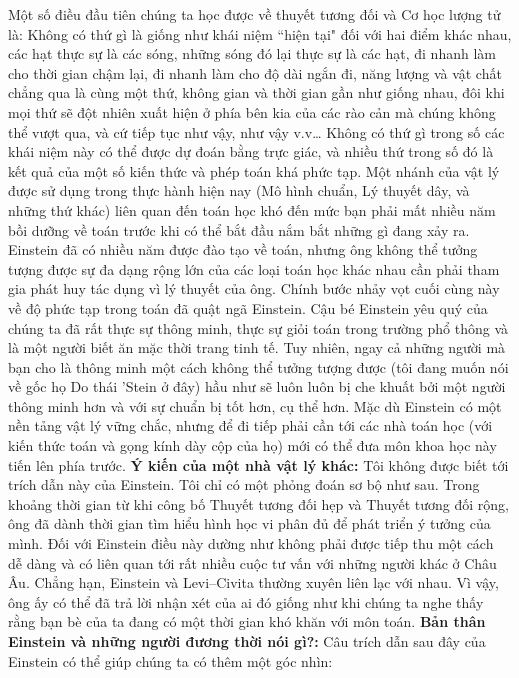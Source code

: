 \begin{multicols}{2}
	\vskip 0.1cm
	Một số điều đầu tiên chúng ta học được về thuyết tương đối và Cơ học lượng tử là: Không có thứ gì là giống như khái niệm ``hiện tại" đối với hai điểm khác nhau, các hạt thực sự là các sóng, những sóng đó lại thực sự là các hạt, đi nhanh làm cho thời gian chậm lại, đi nhanh làm cho độ dài ngắn đi, năng lượng và vật chất chẳng qua là cùng một thứ, không gian và thời gian gần như giống nhau, đôi khi mọi thứ sẽ đột nhiên xuất hiện ở phía bên kia của các rào cản mà chúng không thể vượt qua, và cứ tiếp tục như vậy, như vậy v.v\ldots
	\vskip 0.1cm
	Không có thứ gì trong số các khái niệm này có thể được dự đoán bằng trực giác, và nhiều thứ trong số đó là kết quả của một số kiến thức và phép toán khá phức tạp.  Một nhánh của vật lý được sử dụng trong thực hành hiện nay (Mô hình chuẩn, Lý thuyết dây, và những thứ khác) liên quan đến toán học khó đến mức bạn phải mất nhiều năm bồi dưỡng về toán trước khi  có thể bắt đầu nắm bắt những gì đang xảy ra.  Einstein đã có nhiều năm được đào tạo về toán, nhưng ông không thể tưởng tượng được sự đa dạng rộng lớn của các loại toán học khác nhau cần phải tham gia phát huy tác dụng vì lý thuyết của ông.
	\vskip 0.1cm
	Chính bước nhảy vọt cuối cùng này về độ phức tạp trong toán  đã quật ngã Einstein.  Cậu bé  Einstein yêu quý của chúng ta đã rất thực sự thông minh, thực sự giỏi toán trong trường phổ thông và là một người biết ăn mặc thời trang tinh tế.  Tuy nhiên, ngay cả những người mà bạn cho là thông minh  một cách không thể tưởng tượng được (tôi đang muốn nói về gốc họ Do thái 'Stein ở đây) hầu như sẽ luôn luôn bị che khuất bởi một người thông minh hơn và với sự chuẩn bị tốt hơn, cụ thể hơn.  Mặc dù Einstein có một nền tảng vật lý vững chắc, nhưng để đi tiếp phải cần tới các nhà toán học (với kiến thức toán và  gọng kính dày cộp của họ) mới có thể  đưa môn khoa học này tiến lên phía trước.
	\vskip 0.1cm
	\textbf{\color{quantoan}Ý kiến của một nhà vật lý khác:} Tôi không được biết  tới trích dẫn này của Einstein. Tôi chỉ có một phỏng đoán sơ bộ như sau. Trong khoảng thời gian từ khi công bố Thuyết tương đối hẹp và Thuyết tương đối rộng, ông đã dành thời gian tìm hiểu hình học vi phân đủ để phát triển ý tưởng của mình. Đối với Einstein điều này dường như không phải được tiếp thu một cách dễ dàng và có liên quan tới rất nhiều cuộc tư vấn với những người khác ở Châu Âu. Chẳng hạn, Einstein và Levi--Civita thường xuyên liên lạc với nhau. Vì vậy, ông ấy có thể đã trả lời nhận xét của ai đó giống như khi chúng ta  nghe  thấy rằng bạn bè của ta đang có một thời gian khó khăn với môn toán.
	\vskip 0.1cm
	\textbf{\color{quantoan}Bản thân Einstein và những người đương thời nói gì?:} Câu trích dẫn sau đây của Einstein có thể giúp chúng ta có thêm một góc nhìn:

\end{multicols}
